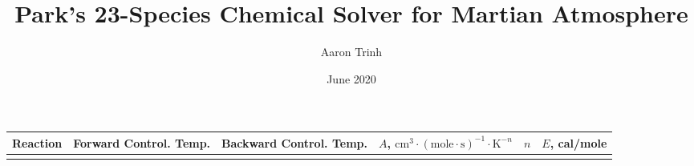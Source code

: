 \documentclass{warpdoc}
\author{
  Aaron Trinh 
}
\title{Park's 23-Species Chemical Solver for Martian Atmosphere
}
\date{
  June 2020
}
\renewcommand{\fontsizetable}{\footnotesize\scalefont{0.9}}
\begin{document}
  \pagestyle{headings}
  \setcounter{page}{1}
  \makewarpdoctitle

\begin{table}[!h]
\fontsizetable
\begin{center}
\begin{threeparttable}
\begin{tabular}{ccccccc} 
\toprule
\multicolumn{2}{c}{Reaction} & Forward Control. Temp. & Backward Control. Temp. & $A$, $\textrm{cm}^3\cdot(\textrm{mole}\cdot \textrm{s})^{-1}\cdot \textrm{K}^{-n}$ & $n$ & $E$, cal/mole \\ 
\midrule

\\


\end{tabular}
\end{threeparttable}
\end{center}
\end{table}
\end{document}
